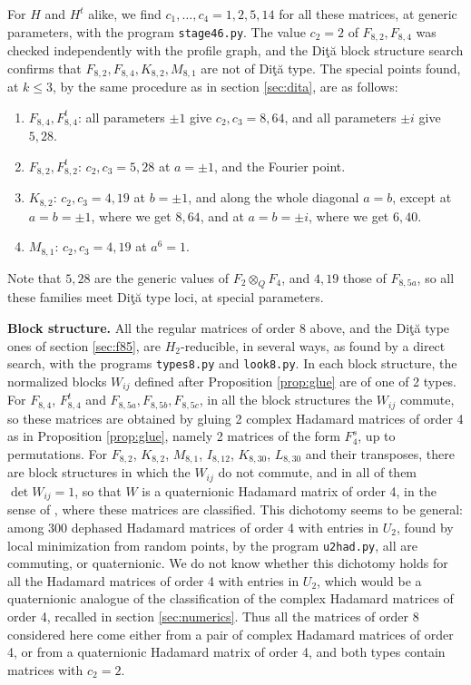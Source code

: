 \documentclass[11pt]{amsart}
\begin{document}
\noindent For $H$ and $H^t$ alike, we find $c_1,\ldots,c_4=1,2,5,14$ for all these matrices, at generic parameters, with the program \texttt{stage46.py}. The value $c_2=2$ of $F_{8,2},F_{8,4}$ was checked independently with the profile graph, and the Di\c t\u a block structure search confirms that $F_{8,2},F_{8,4},K_{8,2},M_{8,1}$ are not of Di\c t\u a type. The special points found, at $k\leq3$, by the same procedure as in section \ref{sec:dita}, are as follows:
\begin{enumerate}
\item $F_{8,4},F_{8,4}^t$: all parameters $\pm1$ give $c_2,c_3=8,64$, and all parameters $\pm i$ give $5,28$.

\item $F_{8,2},F_{8,2}^t$: $c_2,c_3=5,28$ at $a=\pm1$, and the Fourier point.

\item $K_{8,2}$: $c_2,c_3=4,19$ at $b=\pm1$, and along the whole diagonal $a=b$, except at $a=b=\pm1$, where we get $8,64$, and at $a=b=\pm i$, where we get $6,40$.

\item $M_{8,1}$: $c_2,c_3=4,19$ at $a^6=1$.
\end{enumerate}

\noindent Note that $5,28$ are the generic values of $F_2\otimes_QF_4$, and $4,19$ those of $F_{8,5a}$, so all these families meet Di\c t\u a type loci, at special parameters.

\noindent\textbf{Block structure.} All the regular matrices of order 8 above, and the Di\c t\u a type ones of section \ref{sec:f85}, are $H_2$-reducible, in several ways, as found by a direct search, with the programs \texttt{types8.py} and \texttt{look8.py}. In each block structure, the normalized blocks $W_{ij}$ defined after Proposition \ref{prop:glue} are of one of 2 types. For $F_{8,4}$, $F_{8,4}^t$ and $F_{8,5a},F_{8,5b},F_{8,5c}$, in all the block structures the $W_{ij}$ commute, so these matrices are obtained by gluing 2 complex Hadamard matrices of order 4 as in Proposition \ref{prop:glue}, namely 2 matrices of the form $F_4^s$, up to permutations. For $F_{8,2}$, $K_{8,2}$, $M_{8,1}$, $I_{8,12}$, $K_{8,30}$, $L_{8,30}$ and their transposes, there are block structures in which the $W_{ij}$ do not commute, and in all of them $\det W_{ij}=1$, so that $W$ is a quaternionic Hadamard matrix of order 4, in the sense of \cite{cd}, where these matrices are classified. This dichotomy seems to be general: among 300 dephased Hadamard matrices of order 4 with entries in $U_2$, found by local minimization from random points, by the program \texttt{u2had.py}, all are commuting, or quaternionic. We do not know whether this dichotomy holds for all the Hadamard matrices of order 4 with entries in $U_2$, which would be a quaternionic analogue of the classification of the complex Hadamard matrices of order 4, recalled in section \ref{sec:numerics}. Thus all the matrices of order 8 considered here come either from a pair of complex Hadamard matrices of order 4, or from a quaternionic Hadamard matrix of order 4, and both types contain matrices with $c_2=2$.
\end{document}

